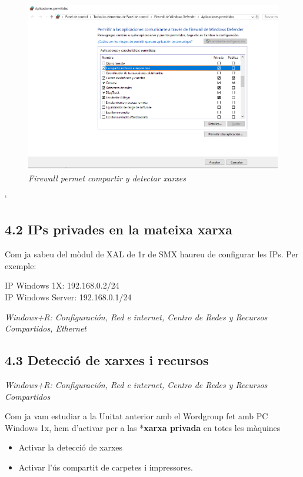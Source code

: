 \documentclass[
  a4paper,
]{article}
\begin{document}
\begin{figure}
\centering
\includegraphics{png/ADDS/FirewallCompartiryDetectar.png}
\caption{\emph{Firewall permet compartir y detectar xarxes}}
\end{figure}

`

\subsection{4.2 IPs privades en la mateixa
xarxa}\label{ips-privades-en-la-mateixa-xarxa}

Com ja sabeu del mòdul de XAL de 1r de SMX haureu de configurar les IPs.
Per exemple:

IP Windows 1X: 192.168.0.2/24\\
IP Windows Server: 192.168.0.1/24

\emph{Windows+R: Configuración, Red e internet, Centro de Redes y
Recursos Compartidos, Ethernet}

\subsection{4.3 Detecció de xarxes i
recursos}\label{detecciuxf3-de-xarxes-i-recursos}

\emph{Windows+R: Configuración, Red e internet, Centro de Redes y
Recursos Compartidos}

Com ja vam estudiar a la Unitat anterior amb el Wordgroup fet amb PC
Windows 1x, hem d'activar per a las *\textbf{xarxa privada} en totes les
màquines

\begin{itemize}
\item
  Activar la detecció de xarxes
\item
  Activar l'ús compartit de carpetes i impressores.
\end{itemize}
\end{document}
